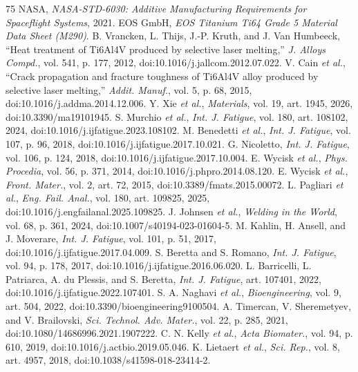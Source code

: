 \documentclass[10pt,journal,letterpaper]{IEEEtran}
\begin{document}
\begin{thebibliography}{75}
 NASA, \emph{NASA-STD-6030: Additive Manufacturing Requirements for Spaceflight Systems}, 2021.
 EOS GmbH, \emph{EOS Titanium Ti64 Grade 5 Material Data Sheet (M290)}.
 B. Vrancken, L. Thijs, J.-P. Kruth, and J. Van Humbeeck, ``Heat treatment of Ti6Al4V produced by selective laser melting,'' \emph{J. Alloys Compd.}, vol. 541, p. 177, 2012, doi:10.1016/j.jallcom.2012.07.022.
 V. Cain \emph{et al.}, ``Crack propagation and fracture toughness of Ti6Al4V alloy produced by selective laser melting,'' \emph{Addit. Manuf.}, vol. 5, p. 68, 2015, doi:10.1016/j.addma.2014.12.006.
 Y. Xie \emph{et al.}, \emph{Materials}, vol. 19, art. 1945, 2026, doi:10.3390/ma19101945.
 S. Murchio \emph{et al.}, \emph{Int. J. Fatigue}, vol. 180, art. 108102, 2024, doi:10.1016/j.ijfatigue.2023.108102.
 M. Benedetti \emph{et al.}, \emph{Int. J. Fatigue}, vol. 107, p. 96, 2018, doi:10.1016/j.ijfatigue.2017.10.021.
 G. Nicoletto, \emph{Int. J. Fatigue}, vol. 106, p. 124, 2018, doi:10.1016/j.ijfatigue.2017.10.004.
 E. Wycisk \emph{et al.}, \emph{Phys. Procedia}, vol. 56, p. 371, 2014, doi:10.1016/j.phpro.2014.08.120.
 E. Wycisk \emph{et al.}, \emph{Front. Mater.}, vol. 2, art. 72, 2015, doi:10.3389/fmats.2015.00072.
 L. Pagliari \emph{et al.}, \emph{Eng. Fail. Anal.}, vol. 180, art. 109825, 2025, doi:10.1016/j.engfailanal.2025.109825.
 J. Johnsen \emph{et al.}, \emph{Welding in the World}, vol. 68, p. 361, 2024, doi:10.1007/s40194-023-01604-5.
 M. Kahlin, H. Ansell, and J. Moverare, \emph{Int. J. Fatigue}, vol. 101, p. 51, 2017, doi:10.1016/j.ijfatigue.2017.04.009.
 S. Beretta and S. Romano, \emph{Int. J. Fatigue}, vol. 94, p. 178, 2017, doi:10.1016/j.ijfatigue.2016.06.020.
 L. Barricelli, L. Patriarca, A. du Plessis, and S. Beretta, \emph{Int. J. Fatigue}, art. 107401, 2022, doi:10.1016/j.ijfatigue.2022.107401.
 S. A. Naghavi \emph{et al.}, \emph{Bioengineering}, vol. 9, art. 504, 2022, doi:10.3390/bioengineering9100504.
 A. Timercan, V. Sheremetyev, and V. Brailovski, \emph{Sci. Technol. Adv. Mater.}, vol. 22, p. 285, 2021, doi:10.1080/14686996.2021.1907222.
 C. N. Kelly \emph{et al.}, \emph{Acta Biomater.}, vol. 94, p. 610, 2019, doi:10.1016/j.actbio.2019.05.046.
 K. Lietaert \emph{et al.}, \emph{Sci. Rep.}, vol. 8, art. 4957, 2018, doi:10.1038/s41598-018-23414-2.

\end{thebibliography}
\end{document}
